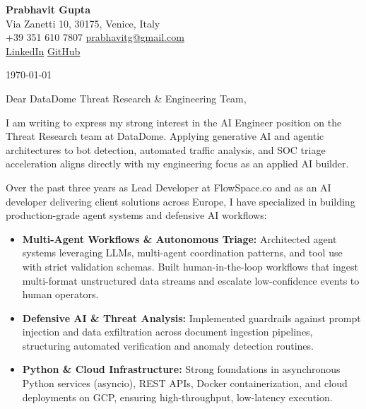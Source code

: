 \documentclass[11pt,a4paper]{article}
\begin{document}
\begin{center}
    {\huge \textbf{Prabhavit Gupta}} \\
    \vspace{4pt}
    Via Zanetti 10, 30175, Venice, Italy \\
    +39 351 610 7807 \textbar{} \href{mailto:prabhavitg@gmail.com}{prabhavitg@gmail.com} \\
    \href{https://www.linkedin.com/in/prabhavit/}{LinkedIn} \textbar{} \href{https://github.com/prab-gupta}{GitHub}
\end{center}

\vspace{10pt}

\noindent \today

\vspace{6pt}

\noindent Dear DataDome Threat Research \& Engineering Team,

\vspace{6pt}

\noindent I am writing to express my strong interest in the AI Engineer position on the Threat Research team at DataDome. Applying generative AI and agentic architectures to bot detection, automated traffic analysis, and SOC triage acceleration aligns directly with my engineering focus as an applied AI builder.

\vspace{6pt}

\noindent Over the past three years as Lead Developer at FlowSpace.co and as an AI developer delivering client solutions across Europe, I have specialized in building production-grade agent systems and defensive AI workflows:

\begin{itemize}[leftmargin=*]
    \item \textbf{Multi-Agent Workflows \& Autonomous Triage:} Architected agent systems leveraging LLMs, multi-agent coordination patterns, and tool use with strict validation schemas. Built human-in-the-loop workflows that ingest multi-format unstructured data streams and escalate low-confidence events to human operators.
    \item \textbf{Defensive AI \& Threat Analysis:} Implemented guardrails against prompt injection and data exfiltration across document ingestion pipelines, structuring automated verification and anomaly detection routines.
    \item \textbf{Python \& Cloud Infrastructure:} Strong foundations in asynchronous Python services (asyncio), REST APIs, Docker containerization, and cloud deployments on GCP, ensuring high-throughput, low-latency execution.
\end{itemize}
\end{document}
